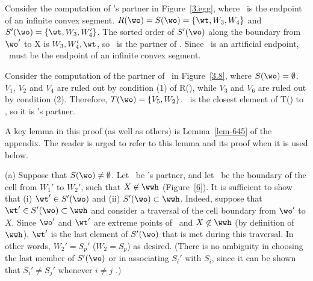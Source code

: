 \begin{example}
Consider the computation of \wo's partner in Figure~\ref{3.egg}, 
where \wo\ is the endpoint of an infinite convex segment.
\mbox{$R(\wo) = S(\wo) = \{\wt,W_{3},W_{4}\}$} and
\mbox{$S'(\wo) = \{\wt,W_{3},W_{4}'\}$}.
The sorted order of $S'(\wo)$ along the boundary from $\wo '$ to X
is $W_{3},W_{4}',\wt$, so \wt\ is the partner of \wo.  
Since \wt\ is an artificial endpoint, \wo\ must be the endpoint of an 
infinite convex segment.

Consider the computation of the partner of \wo\ in Figure~\ref{3.8},
where $S(\wo) = \emptyset$.
$V_{1}$, $V_{2}$ and $V_{4}$ are ruled out by condition (1) of R(\wo),
while $V_{3}$ and $V_{6}$ are ruled out by condition (2).
Therefore, $T(\wo) = \{V_{5},W_{2}\}$.
\wt\ is the closest element of T(\wo) to \wo, so it is \wo's partner.
\end{example}



A key lemma in this proof (as well as others) is Lemma~\ref{lem-645} of the appendix.
The reader is urged to refer to this lemma and its proof when it is used below.

(a) Suppose that $S(\wo) \neq \emptyset$.
Let \wt\ be \wo's partner, and let \wwh\ be the boundary of the cell 
from $W_{1}'$ to $W_{2}'$, such that $X \not\in \wwh$ (Figure~\ref{6}).
%
%
It is sufficient to show that (i) $\wt ' \in S'(\wo)$ and (ii) $S'(\wo) \subset \wwh$.
Indeed, suppose that $\wt ' \in S'(\wo) \subset \wwh$
and consider a traversal of the cell boundary from $\wo '$ to $X$. 
Since $\wo '$ and $\wt '$ are extreme points of \wwh\ and
$X \not \in \wwh$ (by definition of $\wwh$), 
$\wt '$ is the last element of $S'(\wo)$ that is met during this traversal.
In other words, $W_{2}' = S_{p}'$ ($W_{2} = S_{p}$) as desired.
(There is no ambiguity in choosing the last member of $S'(\wo)$ or in associating
$S_{i}'$ with $S_{i}$, since it can be shown that $S_{i}' \neq S_{j}'$ 
whenever $i \neq j$ \cite[p. 75]{jj}.)  %


